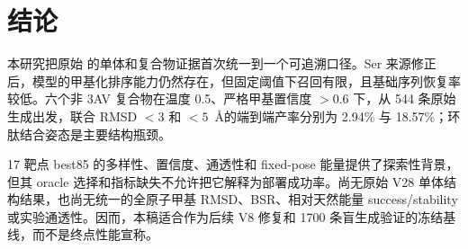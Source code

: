 \section{结论}

本研究把原始  的单体和复合物证据首次统一到一个可追溯口径。Ser 来源修正后，模型的甲基化排序能力仍然存在，但固定阈值下召回有限，且基础序列恢复率较低。六个非 3AV 复合物在温度 0.5、严格甲基置信度 $>0.6$ 下，从 544 条原始生成出发，联合 RMSD $<3$ 和 $<5$~\AA 的端到端产率分别为 2.94\% 与 18.57\%；环肽结合姿态是主要结构瓶颈。

17 靶点 best85 的多样性、置信度、通透性和 fixed-pose 能量提供了探索性背景，但其 oracle 选择和指标缺失不允许把它解释为部署成功率。尚无原始 V28 单体结构结果，也尚无统一的全原子甲基 RMSD、BSR、相对天然能量 success/stability 或实验通透性。因而，本稿适合作为后续 V8 修复和 1700 条盲生成验证的冻结基线，而不是终点性能宣称。
